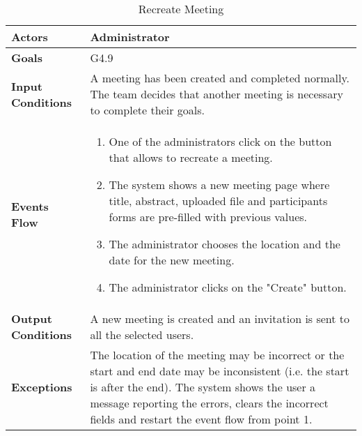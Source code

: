 \begin{table}[H]
	\centering
	\def\arraystretch{1.5}
	\begin{tabular}{|p{7cm}|p{7cm}|}
		\hline
		\textbf{Actors}            & Administrator    \\ \hline
		\textbf{Goals}             & G4.9           \\ \hline
		\textbf{Input Conditions}  & A meeting has been created and completed normally. The team decides that another meeting is necessary to complete their goals. \\ \hline
		\textbf{Events Flow}       & 
		\begin{enumerate}[topsep=0pt, leftmargin=*]
			\item One of the administrators click on the button that allows to recreate a meeting.
			\item The system shows a new meeting page where title, abstract, uploaded file and participants forms are pre-filled with previous values.
			\item The administrator chooses the location and the date for the new meeting.
			\item The administrator clicks on the "Create" button.
		\end{enumerate}              \\ \hline
		\textbf{Output Conditions} & A new meeting is created and an invitation is sent to all the selected users.           \\ \hline
		\textbf{Exceptions}        & The location of the meeting may be incorrect or the start and end date may be inconsistent (i.e. the start is after the end). The system shows the user a message reporting the errors,
		clears the incorrect fields and restart the event
		flow from point 1.           \\ \hline
	\end{tabular}
	\caption{Recreate Meeting}
\end{table}

